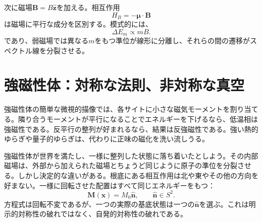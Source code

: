 \begin{classroomqa}
\end{classroomqa}

次に磁場\(\mathbf B=B\hat{\mathbf z}\)を加える。相互作用
\begin{equation}
H_B=-\boldsymbol{\mu}\cdot\mathbf B
\end{equation}
は磁場に平行な成分を区別する。模式的には、
\begin{equation}
\Delta E_m\propto mB.
\label{eq:l9-zeeman}
\end{equation}
であり、弱磁場では異なる\(m\)をもつ準位が線形に分離し、それらの間の遷移がスペクトル線を分裂させる。

\begin{classroomqa}
\end{classroomqa}

\begin{center}
\end{center}

\section{強磁性体：対称な法則、非対称な真空}

強磁性体の簡単な微視的描像では、各サイトに小さな磁気モーメントを割り当てる。隣り合うモーメントが平行になることでエネルギーを下げるなら、低温相は強磁性である。反平行の整列が好まれるなら、結果は反強磁性である。強い熱的ゆらぎや量子的ゆらぎは、代わりに正味の磁化を洗い流しうる。

強磁性体が世界を満たし、一様に整列した状態に落ち着いたとしよう。その内部磁場は、外部から加えられた磁場とちょうど同じように原子の準位を分裂させる。しかし決定的な違いがある。根底にある相互作用は北や東やその他の方向を好まない。一様に回転させた配置はすべて同じエネルギーをもつ：
\begin{equation}
\mathbf M(\mathbf x)=M_0\hat{\mathbf n},
\qquad
\hat{\mathbf n}\in S^2.
\label{eq:l9-ferromagnetic-vacua}
\end{equation}
方程式は回転不変であるが、一つの実際の基底状態は一つの\(\hat{\mathbf n}\)を選ぶ。これは明示的対称性の破れではなく、自発的対称性の破れである。

